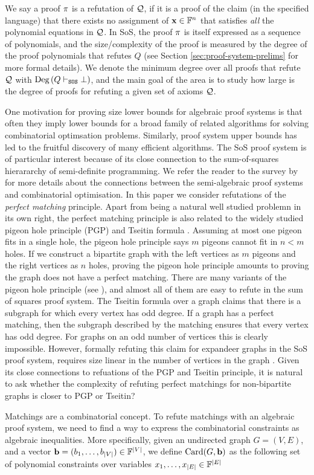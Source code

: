 \documentclass[11pt]{article}
\begin{document}
We say a proof $\pi$ is a refutation of $\mathcal{Q}$, if it is a proof of the claim (in the specified language) that there exists no assignment of $\mathbf{x} \in \mathbb{F}^n$ that satisfies \emph{all} the polynomial equations in $\mathcal{Q}$. 
In SoS, the proof $\pi$ is itself expressed as a sequence of polynomials, and the size/complexity of the proof is measured by the degree of the proof polynomials that refutes $Q$ (see Section \ref{sec:proof-system-prelims} for more formal details).
We denote the minimum degree over all proofs that refute $\mathcal{Q}$ with $\text{Deg}\left(Q \vdash_{\texttt{SOS}} \bot\right)$, and the main goal of the area is to study how large is the degree of proofs for refuting a given set of axioms $\mathcal{Q}$.\par
One motivation for proving size lower bounds for algebraic proof systems is that often they imply lower bounds for a broad family of related algorithms for solving combinatorial optimsation problems.
Similarly, proof system upper bounds has led to the fruitful discovery of many efficient algorithms.
The SoS proof system is of particular interest because of its close connection to the sum-of-squares hierararchy of semi-definite programming.
We refer the reader to the survey by \citet{fleming2019semialgebraic} for more details about the connections between the semi-algebraic proof systems and combinatorial optimisation.
In this paper we consider refutations of the \emph{perfect matching} principle.
Apart from being a natural well studied problemn in its own right, the perfect matching principle is also related to the widely studied pigeon hole principle (PGP) \citep{razbarov2002pgp} and Tseitin formula \citep{grigoriev2001linear}.
Assuming at most one pigeon fits in a single hole, the pigeon hole principle says $m$ pigeons cannot fit in $n < m$ holes.
If we construct a bipartite graph with the left vertices as $m$ pigeons and the right vertices as $n$ holes, proving the pigeon hole principle amounts to proving the graph does not have a perfect matching.
There are many variants of the pigeon hole principle (see \citep{razbarov2002pgp}), and almost all of them are easy to refute in the sum of squares proof system.
The Tseitin formula over a graph claims that there is a subgraph for which every vertex has odd degree.
If a graph has a perfect matching, then the subgraph described by the matching ensures that every vertex has odd degree.
For graphs on an odd number of vertices this is clearly impossible.
However, formally refuting this claim for expandeer graphs in the SoS proof system, requires size linear in the number of vertices in the graph \cite{grigoriev2001linear}.
Given its close connections to refuations of the PGP and Tseitin principle, it is natural to ask whether the complexity of refuting perfect matchings for non-bipartite graphs is closer to PGP or Tseitin?
\par
Matchings are a combinatorial concept. To refute matchings with an algebraic proof system, we need to find a way to express the combinatorial constraints as algebraic inequalities.
More specifically, given an undirected graph $G=(V,E)$, and a vector $\mathbf{b} = (b_1, \dots, b_{|V|})  \in \mathbb{F}^{|V|}$, we define $\text{Card}(G, \mathbf{b})$ as the following set of polynomial constraints over variables $x_1, \dots, x_{|E|} \in \mathbb{F}^{|E|}$
\end{document}
